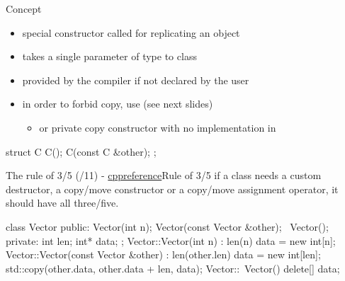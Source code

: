 \begin{frame}[fragile]
  \begin{block}{Concept}
    \begin{itemize}
    \item special constructor called for replicating an object
    \item takes a single parameter of type  to class
    \item provided by the compiler if not declared by the user
    \item in order to forbid copy, use  (see next slides)
      \begin{itemize}
      \item or private copy constructor with no implementation in 
      \end{itemize}
    \end{itemize}
  \end{block}
  \pause
  \begin{cppcode}
    struct C {
      C();
      C(const C &other);
    };
  \end{cppcode}
  \pause
  \begin{goodpracticeWithShortcut}{The rule of 3/5 (/11) - \href{https://en.cppreference.com/w/cpp/language/rule_of_three}{cppreference}}{Rule of 3/5}
    if a class needs a custom destructor, a copy/move constructor or a copy/move assignment operator, it should have all three/five.
  \end{goodpracticeWithShortcut}
\end{frame}

\begin{frame}[fragile]
  \begin{cppcode}
    class Vector {
    public:
      Vector(int n);
      Vector(const Vector &other);
      ~Vector();
    private:
      int len; int* data;
    };
    Vector::Vector(int n) : len(n) {
      data = new int[n];
    }
    Vector::Vector(const Vector &other) : len(other.len) {
      data = new int[len];
      std::copy(other.data, other.data + len, data);
    }
    Vector::~Vector() { delete[] data; }
  \end{cppcode}
\end{frame}

